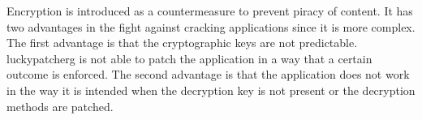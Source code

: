 Encryption is introduced as a countermeasure to prevent piracy of content.
It has two advantages in the fight against cracking applications since it is more complex.
The first advantage is that the cryptographic keys are not predictable.
\gls{luckypatcherg} is not able to patch the application in a way that a certain outcome is enforced.
The second advantage is that the application does not work in the way it is intended when the decryption key is not present or the decryption methods are patched.
